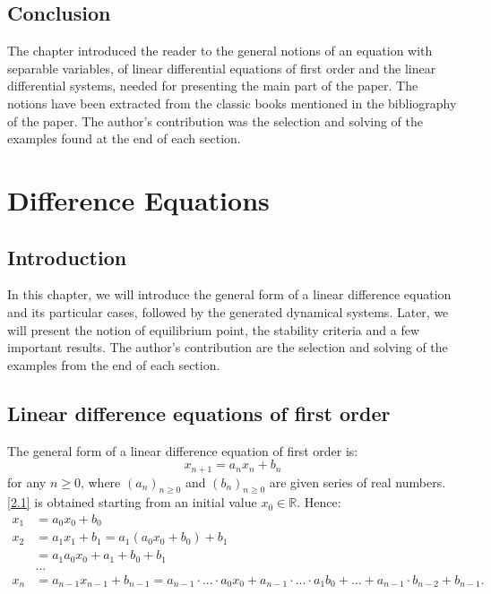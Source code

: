 \documentclass[a4paper,11pt]{report}
\newcommand{\R}{\mathbb{R}}
\begin{document}
\section{Conclusion}
The chapter introduced the reader to the general notions of an equation with separable variables, of linear differential equations of first order and the linear differential systems, needed for presenting the main part of the paper. The notions have been extracted from the classic books mentioned in the bibliography of the paper. The author's contribution was the selection and solving of the examples found at the end of each section.

    
    
    \chapter{Difference Equations}
    \section{Introduction}
    In this chapter, we will introduce the general form of a linear difference equation and its particular cases, followed by the generated dynamical systems. Later, we will present the notion of equilibrium point, the stability criteria and a few important results. The author's contribution are the selection and solving of the examples from the end of each section.
    \section{Linear difference equations of first order}
    The general form of a linear difference equation of first order is:
    \begin{equation} 
     x_{n+1}=a_{n}x_{n}+b_{n} \label{2.1}
    \end{equation}
    for any $n \geq 0$, where $(a_{n})_{n\geq 0}$ and $(b_{n})_{n\geq 0}$ are given series of real numbers. 
\eqref{2.1} is obtained starting from an initial value $x_{0} \in \R$. Hence:
\begin{align*}
 x_{1} & =a_{0}x_{0}+b_{0}\\
   x_{2} & =a_{1}x_{1}+b_{1} = a_{1}(a_{0}x_{0}+b_{0})+b_{1}\\
  & = a_{1}a_{0}x_{0}+a_{1}+b_{0}+b_{1}\\
  & ...\\
   x_{n}&=a_{n-1}x_{n-1}+b_{n-1} = a_{n-1}\cdot ... \cdot a_{0}x_{0}+a_{n-1}\cdot ...\cdot a_{1}b_{0}+...+a_{n-1}\cdot b_{n-2}+b_{n-1}.
\end{align*}
\end{document}

